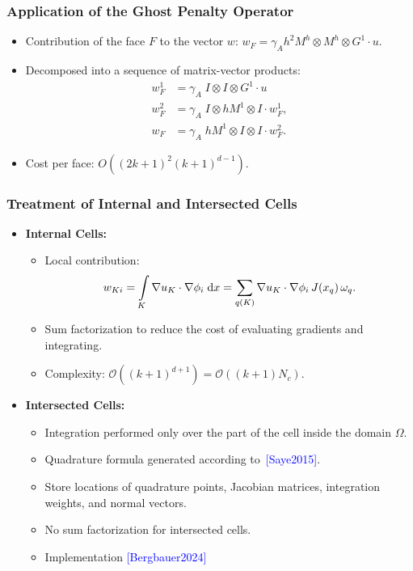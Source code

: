 \documentclass{beamer}
\begin{document}
\begin{frame}
    \frametitle{Application of the Ghost Penalty Operator}
    \begin{itemize}
        \item Contribution of the face $F$ to the vector $w$:
              \(
              w_F =  \gamma_A  h^{2} M^h \otimes M^h \otimes G^1	\cdot u.
              \)
        \item Decomposed into a sequence of matrix-vector products:
              \begin{align*}
                  w_F^1 & =  \gamma_A \;  I \otimes I \otimes G^1 \cdot u          \\
                  w_F^2 & =  \gamma_A \;  I \otimes h M^1 \otimes I \cdot w_F^{1}, \\
                  w_F   & =  \gamma_A \; h M^1 \otimes I \otimes I \cdot w_F^{2}.
              \end{align*}
        \item Cost per face: $O((2k+1)^2 (k+1)^{d-1}) $.
    \end{itemize}
\end{frame}

\begin{frame}
    \frametitle{Treatment of Internal and Intersected Cells}
    \begin{itemize}
        \item \textbf{Internal Cells:}
              \begin{itemize}
                  \item Local contribution:
                        \[
                            w_{Ki}=\int\limits_K	\nabla u_K   \cdot \nabla {\phi }_i \;	\text{d} x
                            = \sum_{q(K)} \nabla u_K   \cdot  \nabla\phi_i \, J(x_q) \,
                            \omega_q.
                        \]
                  \item Sum factorization to reduce the cost of evaluating gradients and integrating.
                  \item Complexity: $\mathcal{O}((k+1)^{d+1}) = \mathcal{O}((k+1)     N_c)$.
              \end{itemize}
        \item \textbf{Intersected Cells:}
              \begin{itemize}
                  \item Integration performed only over the part of the cell inside the domain $\Omega$.
                  \item Quadrature formula generated according to~\textcolor{blue}{[Saye2015]}.
                  \item Store locations of quadrature points, Jacobian matrices, integration weights, and normal
                        vectors.
                  \item No sum factorization for intersected cells.
                  \item Implementation	\textcolor{blue}{[Bergbauer2024]}
              \end{itemize}
    \end{itemize}
\end{frame}
\end{document}
